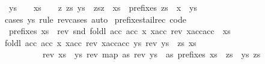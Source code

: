 \begin{isabellebody}
\ \ {\isacharparenleft}ys\ {\isacharequal}\ {\isacharbrackleft}{\isacharbrackright}\ {\isasymand}\ xs\ {\isacharequal}\ {\isacharbrackleft}{\isacharbrackright}\ {\isasymor}\ {\isacharparenleft}{\isasymexists}z\ zs{\isachardot}\ ys\ {\isacharequal}\ zs{\isacharat}{\isacharbrackleft}z{\isacharbrackright}\ {\isasymand}\ xs\ {\isacharequal}\ prefixes\ zs{\isacharparenright}{\isacharparenright}\ {\isasymand}\ x\ {\isacharequal}\ ys{\isachardoublequoteclose}\isanewline
%
\isadelimproof
\ \ %
\endisadelimproof
%
\isatagproof
{}\isamarkupfalse%
\ {\isacharparenleft}cases\ ys\ rule{\isacharcolon}\ rev{\isacharunderscore}cases{\isacharparenright}\ auto%
\endisatagproof
{\isafoldproof}%
%
\isadelimproof
\isanewline
%
\endisadelimproof
\isanewline
{}\isamarkupfalse%
\ prefixes{\isacharunderscore}tailrec\ {\isacharbrackleft}code{\isacharbrackright}{\isacharcolon}\ \isanewline
\ \ {\isachardoublequoteopen}prefixes\ xs\ {\isacharequal}\ rev\ {\isacharparenleft}snd\ {\isacharparenleft}foldl\ {\isacharparenleft}{\isasymlambda}{\isacharparenleft}acc{}{\isacharcomma}\ acc{}{\isacharparenright}\ x{\isachardot}\ {\isacharparenleft}x{\isacharhash}acc{}{\isacharcomma}\ rev\ {\isacharparenleft}x{\isacharhash}acc{}{\isacharparenright}{\isacharhash}acc{}{\isacharparenright}{\isacharparenright}\ {\isacharparenleft}{\isacharbrackleft}{\isacharbrackright}{\isacharcomma}{\isacharbrackleft}{\isacharbrackleft}{\isacharbrackright}{\isacharbrackright}{\isacharparenright}\ xs{\isacharparenright}{\isacharparenright}{\isachardoublequoteclose}\isanewline
%
\isadelimproof
%
\endisadelimproof
%
\isatagproof
{}\isamarkupfalse%
\ {\isacharminus}\isanewline
\ \ \isamarkupfalse%
\ {\isachardoublequoteopen}foldl\ {\isacharparenleft}{\isasymlambda}{\isacharparenleft}acc{}{\isacharcomma}\ acc{}{\isacharparenright}\ x{\isachardot}\ {\isacharparenleft}x{\isacharhash}acc{}{\isacharcomma}\ rev\ {\isacharparenleft}x{\isacharhash}acc{}{\isacharparenright}{\isacharhash}acc{}{\isacharparenright}{\isacharparenright}\ {\isacharparenleft}ys{\isacharcomma}\ rev\ ys\ {\isacharhash}\ zs{\isacharparenright}\ xs\ {\isacharequal}\isanewline
\ \ \ \ \ \ \ \ \ \ {\isacharparenleft}rev\ xs\ {\isacharat}\ ys{\isacharcomma}\ rev\ {\isacharparenleft}map\ {\isacharparenleft}{\isasymlambda}as{\isachardot}\ rev\ ys\ {\isacharat}\ as{\isacharparenright}\ {\isacharparenleft}prefixes\ xs{\isacharparenright}{\isacharparenright}\ {\isacharat}\ zs{\isacharparenright}{\isachardoublequoteclose}\ \ ys\ zs\isanewline

\end{isabellebody}
